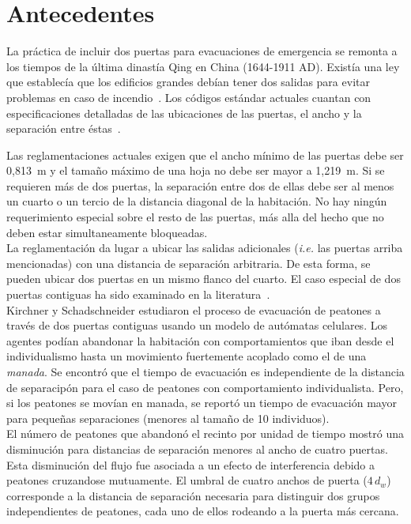\section{Antecedentes}

La práctica de incluir dos puertas para evacuaciones de emergencia se remonta a los tiempos de la última dinastía Qing en China (1644-1911 AD). Existía una ley que establecía que los edificios grandes debían tener dos salidas para evitar problemas en caso de incendio~\cite{cheng}.
Los códigos estándar actuales cuantan con especificaciones detalladas de las ubicaciones de las puertas, el ancho y la separación entre éstas~\cite{OSHA,FLO}.
 
Las reglamentaciones actuales exigen que el ancho mínimo de las puertas debe ser 0,813~m y el tamaño máximo de una hoja no debe ser mayor a 1,219~m\cite{FLO,FLO2}. Si se requieren más de dos puertas, la separación entre dos de ellas debe ser al menos un cuarto o un tercio de la distancia diagonal de la habitación. No hay ningún requerimiento especial sobre el resto de las puertas, más alla del hecho que no deben estar simultaneamente bloqueadas\cite{FLO,FLO2}.\\

La reglamentación da lugar a ubicar las salidas adicionales (\emph{i.e.} las puertas arriba mencionadas) con una distancia de separación arbitraria. De esta forma, se pueden ubicar dos puertas en un mismo flanco del cuarto. El caso especial de dos puertas contiguas ha sido examinado en la literatura~\cite{kirchner1,perez1,daoliang1,huanhuan1}. \\

Kirchner y Schadschneider estudiaron el proceso de evacuación de peatones a través de dos puertas contiguas usando un modelo de autómatas celulares\cite{kirchner1}. Los agentes podían abandonar la habitación con comportamientos que iban desde el individualismo hasta un movimiento fuertemente acoplado como el de una \emph{manada}. Se encontró que el tiempo de evacuación es independiente de la distancia de separacipón para el caso de peatones con comportamiento individualista. Pero, si los peatones se movían en manada, se reportó un tiempo de evacuación mayor para pequeñas separaciones (menores al tamaño de 10 individuos).\\

El número de peatones que abandonó el recinto por unidad de tiempo mostró una disminución para distancias de separación menores al ancho de cuatro puertas\cite{perez1}. Esta disminución del flujo fue asociada a un efecto de interferencia debido a peatones cruzandose mutuamente. El umbral de cuatro anchos de puerta ($4\,d_w$) corresponde a la distancia de separación necesaria para distinguir dos  grupos independientes de peatones, cada uno de ellos rodeando a la puerta más cercana. \\

